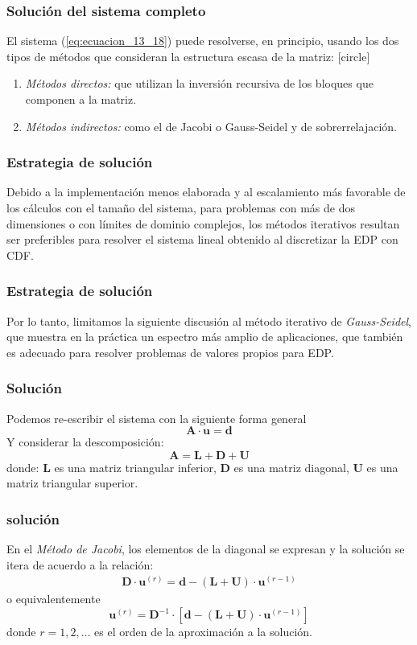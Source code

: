 \begin{frame}
\frametitle{Solución del sistema completo}
El sistema (\ref{eq:ecuacion_13_18}) puede resolverse, en principio, usando los dos tipos de métodos que consideran la estructura escasa de la matriz:
[circle]
\begin{enumerate}[<+->]
\item \emph{Métodos directos: } que utilizan la inversión recursiva de los bloques que componen a la matriz.
\item \emph{Métodos indirectos: } como el de Jacobi o Gauss-Seidel y de sobrerrelajación.
\end{enumerate}
\end{frame}
\begin{frame}
\frametitle{Estrategia de solución}
Debido a la implementación menos elaborada y al escalamiento más favorable de los cálculos con el tamaño del sistema, para problemas con más de dos dimensiones o con límites de dominio complejos, los métodos iterativos resultan ser preferibles para resolver el sistema lineal obtenido al discretizar la EDP con CDF.
\end{frame}
\begin{frame}
\frametitle{Estrategia de solución}
Por lo tanto, limitamos la siguiente discusión al método iterativo de \emph{Gauss-Seidel}, que muestra en la práctica un espectro más amplio de aplicaciones, que también es adecuado para resolver problemas de valores propios para EDP.
\end{frame}
\begin{frame}
\frametitle{Solución}
Podemos re-escribir el sistema con la siguiente forma general
\begin{equation}
\mathbf{A \cdot u} =  \mathbf{d}
\label{eq:ecuacion_13_19} 
\end{equation}
\pause
Y considerar la descomposición:
\begin{equation}
\mathbf{A} = \mathbf{L} + \mathbf{D} + \mathbf{U}
\label{eq:ecuacion_13_20}
\end{equation}
donde: $\mathbf{L}$ es una matriz triangular inferior, $\mathbf{D}$ es una matriz diagonal, $\mathbf{U}$ es una matriz triangular superior.
\end{frame}
\begin{frame}
\frametitle{solución}
En el \emph{Método de Jacobi}, los elementos de la diagonal se expresan y la solución se itera de acuerdo a la relación:
\begin{align*}
\mathbf{D} \cdot \mathbf{u}^{(r)} = \mathbf{d} - (\mathbf{L} + \mathbf{U}) \cdot \mathbf{u}^{(r-1)}
\end{align*}
o equivalentemente
\begin{equation}
\mathbf{u}^{(r)} = \mathbf{D}^{-1} \cdot \left[ \mathbf{d} - (\mathbf{L} + \mathbf{U}) \cdot \mathbf{u}^{(r-1)} \right]
\label{eq:ecuacion_13_21}
\end{equation}
donde $r = 1, 2, \ldots$ es el orden de la aproximación a la solución.
\end{frame}
